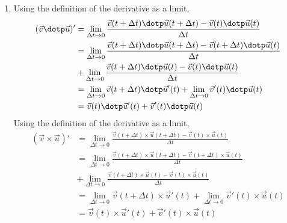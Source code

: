 \begin{enumerate}
    \item Using the definition of the derivative as a limit,
          \begin{align}
              (\vec{v} \dotp \vec{u})' & = \lim_{\Delta t \rightarrow 0}
              \frac{\vec{v}(t + \Delta t) \dotp \vec{u}(t + \Delta t) -
              \vec{v}(t) \dotp \vec{u}(t)}{\Delta t}                     \\
                                       & = \lim_{\Delta t \rightarrow 0}
              \frac{\vec{v}(t + \Delta t) \dotp \vec{u}(t + \Delta t) -
              \vec{v}(t + \Delta t) \dotp \vec{u}(t)}{\Delta t}          \\
                                       & + \lim_{\Delta t \rightarrow 0}
              \frac{\vec{v}(t + \Delta t) \dotp \vec{u}(t) -
              \vec{v}(t) \dotp \vec{u}(t)}{\Delta t}                     \\
                                       & = \lim_{\Delta t \rightarrow 0}
              \vec{v}(t + \Delta t) \dotp \vec{u}'(t) +
              \lim_{\Delta t \rightarrow 0} \vec{v}'(t) \dotp \vec{u}(t) \\
                                       & =
              \vec{v}(t) \dotp \vec{u}'(t) + \vec{v}'(t) \dotp \vec{u}(t)
          \end{align}
          Using the definition of the derivative as a limit,
          \begin{align}
              (\vec{v} \times \vec{u})' & = \lim_{\Delta t \rightarrow 0}
              \frac{\vec{v}(t + \Delta t) \times \vec{u}(t + \Delta t) -
              \vec{v}(t) \times \vec{u}(t)}{\Delta t}                     \\
                                        & = \lim_{\Delta t \rightarrow 0}
              \frac{\vec{v}(t + \Delta t) \times \vec{u}(t + \Delta t) -
              \vec{v}(t + \Delta t) \times \vec{u}(t)}{\Delta t}          \\
                                        & + \lim_{\Delta t \rightarrow 0}
              \frac{\vec{v}(t + \Delta t) \times \vec{u}(t) -
              \vec{v}(t) \times \vec{u}(t)}{\Delta t}                     \\
                                        & = \lim_{\Delta t \rightarrow 0}
              \vec{v}(t + \Delta t) \times \vec{u}'(t) +
              \lim_{\Delta t \rightarrow 0} \vec{v}'(t) \times \vec{u}(t) \\
                                        & =
              \vec{v}(t) \times \vec{u}'(t) + \vec{v}'(t) \times \vec{u}(t)
          \end{align}


\end{enumerate}

